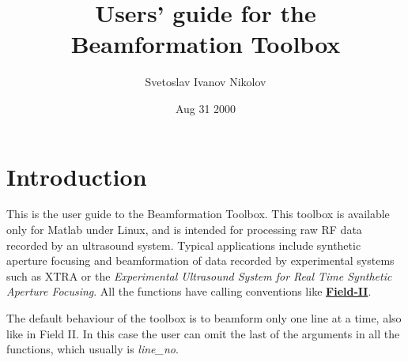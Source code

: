 \documentclass{manual}
\title{Users' guide for the 
Beamformation Toolbox}
\author{Svetoslav Ivanov Nikolov}
\date{Aug 31 2000}
\begin{document}

%
 
\maketitle                 %

\tableofcontents

\chapter{Introduction}
\label{chap_intro}

 This is the user guide to the Beamformation Toolbox. This toolbox is
available only for Matlab under Linux, and is intended for processing 
raw RF data recorded by an ultrasound system. Typical applications include
synthetic aperture focusing and beamformation of data recorded by 
experimental systems such as XTRA or the \emph{Experimental Ultrasound 
System for Real Time Synthetic Aperture Focusing}. 
All the functions have calling conventions like 
{\bf \href{http://www.it.dtu.dk/~jaj/field}{Field-II}}.

The default behaviour of the toolbox is to beamform only one line at a time, 
also like in Field II. In this case the user can omit the last of the 
arguments in all the functions, which usually is {\sl line\_no}.
\end{document}
